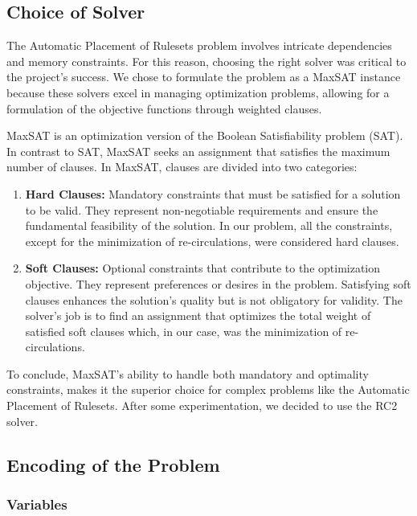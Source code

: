 \subsection{Choice of Solver}

The Automatic Placement of Rulesets problem involves intricate dependencies and memory constraints. For this reason, choosing the right solver was critical to the project's success. We chose to formulate the problem as a MaxSAT instance because these solvers excel in managing optimization problems, allowing for a formulation of the objective functions through weighted clauses.

MaxSAT is an optimization version of the Boolean Satisfiability problem (SAT). In contrast to SAT, MaxSAT seeks an assignment that satisfies the maximum number of clauses. In MaxSAT, clauses are divided into two categories:

\begin{enumerate}
    \item \textbf{Hard Clauses:} Mandatory constraints that must be satisfied for a solution to be valid. They represent non-negotiable requirements and ensure the fundamental feasibility of the solution. In our problem, all the constraints, except for the minimization of re-circulations, were considered hard clauses.

    \item \textbf{Soft Clauses:} Optional constraints that contribute to the optimization objective. They represent preferences or desires in the problem. Satisfying soft clauses enhances the solution's quality but is not obligatory for validity. The solver's job is to find an assignment that optimizes the total weight of satisfied soft clauses which, in our case, was the minimization of re-circulations.
\end{enumerate}

To conclude, MaxSAT's ability to handle both mandatory and optimality constraints, makes it the superior choice for complex problems like the Automatic Placement of Rulesets. After some experimentation, we decided to use the RC2 solver.

\subsection{Encoding of the Problem}

\subsubsection{Variables}

